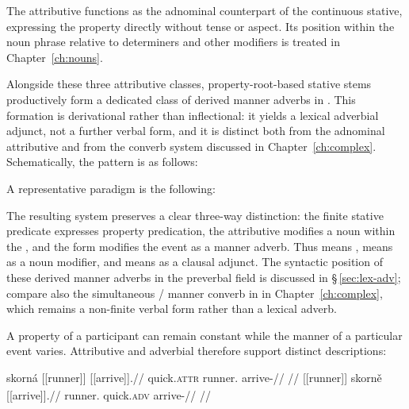 \noindent The attributive functions as the adnominal counterpart of
the continuous stative, expressing the property directly without tense or
aspect. Its position within the noun phrase relative to determiners and other
modifiers is treated in Chapter~\ref{ch:nouns}.

Alongside these three attributive classes, property-root-based stative stems
productively form a dedicated class of derived manner adverbs in 
\label{sec:stative-adv}. This formation is derivational rather than
inflectional: it yields a lexical adverbial adjunct, not a further verbal
form, and it is distinct both from the adnominal attributive and from the
converb system discussed in Chapter~\ref{ch:complex}. Schematically, the
pattern is as follows:

\begin{center}
\end{center}

\noindent A representative paradigm is the following:

\pex
\a {} 
\a {} 
\a {}  
\a {} 
\xe

The resulting system preserves a clear three-way distinction: the finite stative
predicate expresses property predication, the attributive modifies a noun
within the , and the  form modifies the event as a manner
adverb. Thus  means ,  means 
as a noun modifier, and  means  as a clausal adjunct.
The syntactic position of these derived manner adverbs in the preverbal field is
discussed in §\,\ref{sec:lex-adv}; compare also the simultaneous / manner
converb in  in Chapter~\ref{ch:complex}, which remains a non-finite
verbal form rather than a lexical adverb.


A property of a participant can remain constant while the manner of a
particular event varies. Attributive and adverbial  therefore
support distinct descriptions:

\pex\label{ex:deriv-slot-property-manner}
\a
\begingl
\gla skorná \textnormal{[[runner]]}\textsubscript{\Dir{}} \textnormal{[[arrive]]}\textsubscript{\Pf{}}.//
\glb quick.\textsc{attr} runner.\Dir{} arrive-\Pf{}//
\glft {}
//
\endgl
\a
\begingl
\gla \textnormal{[[runner]]}\textsubscript{\Dir{}} skorně \textnormal{[[arrive]]}\textsubscript{\Pf{}}.//
\glb runner.\Dir{} quick.\textsc{adv} arrive-\Pf{}//
\glft {}
//
\endgl
\xe

